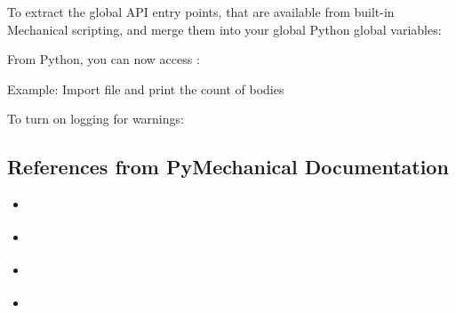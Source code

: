 \documentclass[9pt,landscape]{article}
\begin{document}
\begin{multicols}{3}
To extract the global API entry points, that are available from built-in Mechanical scripting, and merge them into your global Python global variables:


From Python, you can now access : 
 


Example: Import file and print the count of bodies


To turn on logging for warnings:


\subsection{References from PyMechanical Documentation}
\begin{multicols}{2}
\begin{itemize}
    \item \href{https://mechanical.docs.pyansys.com/version/stable/getting_started/index.html}{\color{blue}{Getting Started}}
    \item \href{https://mechanical.docs.pyansys.com/version/stable/examples/index.html}{\color{blue}{Examples}}
    \item \href{https://mechanical.docs.pyansys.com/version/stable/api/index.html}{\color{blue}{API Reference}}
    \item \href{https://ansyshelp.ansys.com/account/secured?returnurl=/Views/Secured/corp/v231/en/act_script/act_script.html}{\color{blue}{Scripting in Mechanical}}
\end{itemize}
\end{multicols}
\end{multicols}
\end{document}
